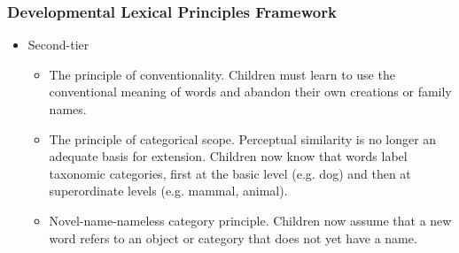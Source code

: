 \documentclass{beamer}
\begin{document}
\begin{frame}
\frametitle{Developmental Lexical Principles Framework }
\begin{itemize}
\item Second-tier 
    \begin{itemize}
        \item The principle of conventionality. Children must learn to use the conventional meaning of words and abandon their own creations or family names.
        \item The principle of categorical scope. Perceptual similarity is no longer an adequate basis for extension. Children now know that words label taxonomic categories, first at the basic level (e.g. dog) and then at superordinate levels (e.g. mammal, animal).
        \item Novel-name-nameless category principle. Children now assume that a new word refers to an object or category that does not yet have a name.
    \end{itemize}
\end{itemize}
\end{frame}
\end{document}
